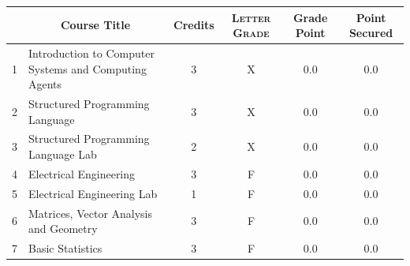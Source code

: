 \documentclass[11pt]{article}
\newcommand*{\numtwo}[1]{\pgfmathprintnumber[
                    fixed, precision=2, fixed zerofill=true]{#1}}
\begin{document}
                \begin{center}
                    \renewcommand{\arraystretch}{1.08}
                    
                \begin{tabular}{|c|l|c|>{\scshape}c|c|c|}
                \hline  \rule[-1ex]{0pt}{3.5ex} {\centering{\bf Course Code}} &  \multicolumn{1}{c|}{\textbf{Course Title}}  & {\bf Credits} & {\bf Letter Grade} & {\bf Grade Point} & {\bf Point Secured}  \\ 
                \hline   1 &  Introduction to Computer Systems and Computing Agents		 & 3 & X & 0.0 & 0.0 \\ %
                \hline   2 &  Structured Programming Language		 & 3 & X & 0.0 & 0.0 \\ %
                \hline   3 &  Structured Programming Language Lab		 & 2 & X & 0.0 & 0.0 \\ %
                \hline   4 &  Electrical Engineering		 & 3 & F & 0.0 & 0.0 \\ %
                \hline   5 &  Electrical Engineering Lab		 & 1 & F & 0.0 & 0.0 \\ %
                \hline   6 &  Matrices, Vector Analysis and Geometry		 & 3 & F & 0.0 & 0.0 \\ %
                \hline   7 &  Basic Statistics		 & 3 & F & 0.0 & 0.0 \\ %

\hline                %
                \end{tabular}
                \end{center}
                \renewcommand{\arraystretch}{1.03}
\end{document}
